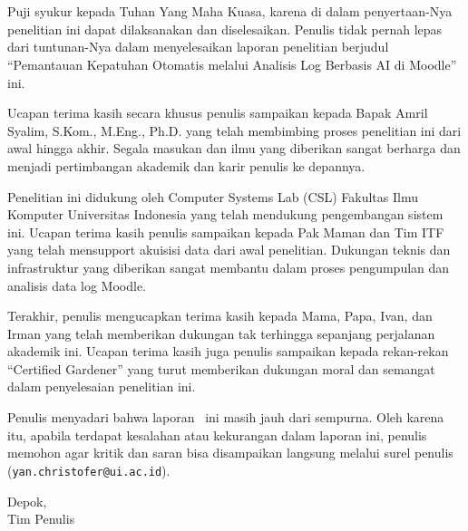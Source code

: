 \pagestyle{onlypage}
\chapter*{\kataPengantar}

Puji syukur kepada Tuhan Yang Maha Kuasa, karena di dalam penyertaan-Nya penelitian ini dapat dilaksanakan dan diselesaikan. Penulis tidak pernah lepas dari tuntunan-Nya dalam menyelesaikan laporan penelitian berjudul ``Pemantauan Kepatuhan Otomatis melalui Analisis Log Berbasis AI di Moodle'' ini.

Ucapan terima kasih secara khusus penulis sampaikan kepada Bapak Amril Syalim, S.Kom., M.Eng., Ph.D. yang telah membimbing proses penelitian ini dari awal hingga akhir. Segala masukan dan ilmu yang diberikan sangat berharga dan menjadi pertimbangan akademik dan karir penulis ke depannya.

Penelitian ini didukung oleh Computer Systems Lab (CSL) Fakultas Ilmu Komputer Universitas Indonesia yang telah mendukung pengembangan sistem ini. Ucapan terima kasih penulis sampaikan kepada Pak Maman dan Tim ITF yang telah mensupport akuisisi data dari awal penelitian. Dukungan teknis dan infrastruktur yang diberikan sangat membantu dalam proses pengumpulan dan analisis data log Moodle.

Terakhir, penulis mengucapkan terima kasih kepada Mama, Papa, Ivan, dan Irman yang telah memberikan dukungan tak terhingga sepanjang perjalanan akademik ini. Ucapan terima kasih juga penulis sampaikan kepada rekan-rekan ``Certified Gardener'' yang turut memberikan dukungan moral dan semangat dalam penyelesaian penelitian ini.

Penulis menyadari bahwa laporan \type~ini masih jauh dari sempurna. Oleh karena itu, apabila terdapat kesalahan atau kekurangan dalam laporan ini, penulis memohon agar kritik dan saran bisa disampaikan langsung melalui surel penulis (\texttt{yan.christofer@ui.ac.id}).



\vspace*{0.1cm}
\begin{flushright}
Depok, \tanggalSiapSidang\\[0.1cm]
\ifx\blank\npmDua
	\vspace*{1.5cm}
	\penulisSatu
\else
	Tim Penulis
\fi

\end{flushright}
